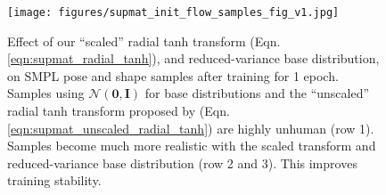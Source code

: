 \begin{figure}[t]
    \centering
    \texttt{[image: figures/supmat\_init\_flow\_samples\_fig\_v1.jpg]}
    \caption{Effect of our ``scaled'' radial tanh transform (Eqn. \ref{eqn:supmat_radial_tanh}), and reduced-variance base distribution, on SMPL pose and shape samples after training for 1 epoch. Samples using $\mathcal{N}(\mathbf{0}, \mathbf{I})$ for base distributions and the ``unscaled'' radial tanh transform proposed by \cite{falorsi2019reparameterizing} (Eqn. \ref{eqn:supmat_unscaled_radial_tanh}) are highly unhuman (row 1). Samples become much more realistic with the scaled transform and reduced-variance base distribution (row 2 and 3). This improves training stability.}
    \vspace{-0.5cm}
    \label{fig:supmat_init_flow_samples_fig}
\end{figure}

